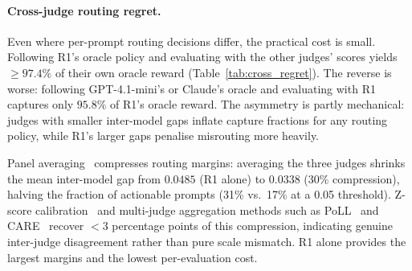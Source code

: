 \paragraph{Cross-judge routing regret.}
Even where per-prompt routing decisions differ, the practical cost is
small.  Following R1's oracle policy and evaluating with the other
judges' scores yields ${\geq}97.4\%$ of their own oracle reward
(Table~\ref{tab:cross_regret}).  The reverse is worse: following
GPT-4.1-mini's or Claude's oracle and evaluating with R1 captures only
$95.8\%$ of R1's oracle reward.  The asymmetry is partly mechanical:
judges with smaller inter-model gaps inflate capture fractions for any
routing policy, while R1's larger gaps penalise misrouting more
heavily.

\begin{table}[h]
\centering
\caption{Cross-judge routing evaluation.  Each cell reports the mean
reward achieved by following the row judge's oracle, evaluated by the
column judge's scores.  Parenthetical values show the fraction of the
column judge's own oracle reward captured ($B = 10{,}000$ bootstrap
resamples).}
\label{tab:cross_regret}
\small
{}
\end{table}
\vspace{6pt}

Panel averaging~\cite{zheng2023judging} compresses routing margins:
averaging the three judges shrinks the mean inter-model gap from
$0.0485$ (R1 alone) to $0.0338$ (30\% compression), halving the
fraction of actionable prompts (31\% vs.\ 17\% at a 0.05 threshold).
Z-score calibration~\cite{hedges1985statistical} and multi-judge
aggregation methods such as PoLL~\cite{verga2024poll} and
CARE~\cite{zhao2025care} recover $< 3$ percentage points of this
compression, indicating genuine inter-judge disagreement rather than
pure scale mismatch.  R1 alone provides the largest margins and the
lowest per-evaluation cost.

